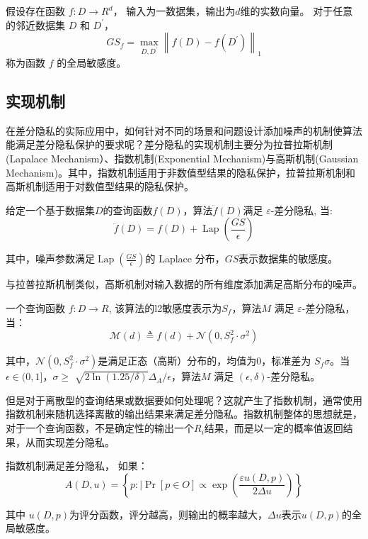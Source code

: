 \begin{define}[全局敏感度]\label{全局敏感度}
假设存在函数 $f: D \rightarrow R^{d}$， 输入为一数据集，输出为$d$维的实数向量。 对于任意的邻近数据集 $D$ 和 $D^{\prime}$，
$$
G S_{f}=\max _{D, D^{\prime}}\left\|f(D)-f\left(D^{\prime}\right)\right\|_{1}
$$
称为函数 $f$ 的全局敏感度。
\end{define}

\subsection{实现机制}
在差分隐私的实际应用中，如何针对不同的场景和问题设计添加噪声的机制使算法能满足差分隐私保护的要求呢？差分隐私的实现机制主要分为拉普拉斯机制(Lapalace Mechanism）、指数机制(Exponential Mechanism)与高斯机制(Gaussian Mechanism)。其中，指数机制适用于非数值型结果的隐私保护，拉普拉斯机制和高斯机制适用于对数值型结果的隐私保护。

\begin{theorem}[拉普拉斯机制]\label{拉普拉斯机制}
给定一个基于数据集$D$的查询函数$f(D)$，算法$\ddot{f}(D)$满足 $\varepsilon$-差分隐私, 当:
$$
\ddot{f}(D)=f(D)+\operatorname{Lap}\left(\frac{G S}{\epsilon}\right)
$$
\end{theorem}
其中，噪声参数满足$\operatorname{Lap}\left(\frac{G S}{\epsilon}\right)$的 Laplace 分布，$GS$表示数据集的敏感度。

与拉普拉斯机制类似，高斯机制对输入数据的所有维度添加满足高斯分布的噪声。
\begin{theorem}[高斯机制]\label{高斯机制}
一个查询函数 $f: D \rightarrow R$, 该算法的l2敏感度表示为$S_{f}$，算法$M$ 满足 $\varepsilon$-差分隐私，当：
$$
\mathcal{M}(d) \triangleq f(d)+\mathcal{N}\left(0, S_{f}^{2} \cdot \sigma^{2}\right)
$$
\end{theorem}
其中，$\mathcal{N}\left(0, S_{f}^{2} \cdot \sigma^{2}\right)$是满足正态（高斯）分布的，均值为0，标准差为 $S_{f} \sigma$。当$\epsilon \in(0,1]$，$\sigma \geq$ $\sqrt{2 \ln (1.25 / \delta)} \Delta_{A} / \epsilon$，算法$M$ 满足 $(\epsilon, \delta)$-差分隐私。

但是对于离散型的查询结果或数据要如何处理呢？这就产生了指数机制，通常使用指数机制来随机选择离散的输出结果来满足差分隐私。指数机制整体的思想就是，对于一个查询函数，不是确定性的输出一个$R_{i}$结果，而是以一定的概率值返回结果，从而实现差分隐私。

\begin{theorem}[指数机制]\label{指数机制}
指数机制满足差分隐私， 如果：
$$
A(D,u)=\left\{p: \mid \operatorname{Pr}[p \in O] \propto \exp \left(\frac{\varepsilon u(D,p)}{2 \Delta u}\right)\right\}
$$
\end{theorem}
其中 $u(D,p)$为评分函数，评分越高，则输出的概率越大，$\Delta u$表示$u(D,p)$的全局敏感度。


